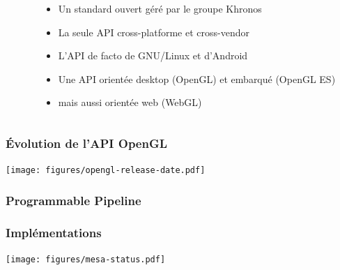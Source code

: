 \begin{frame}
\begin{columns}
\begin{column}{.2\textwidth}
\begin{center}
      \end{center}
    \end{column}
    \begin{column}{.8\textwidth}
      \begin{itemize}
        \item Un standard ouvert géré par le groupe Khronos
        \item La seule API cross-platforme et cross-vendor
        \item L'API de facto de GNU/Linux et d'Android
        \item Une API orientée desktop (OpenGL) et embarqué (OpenGL ES)
        \item mais aussi orientée web (WebGL)
      \end{itemize}
    \end{column}
  \end{columns}
\end{frame}

\begin{frame}
  \frametitle{Évolution de l'API OpenGL}
  \begin{center}
    \texttt{[image: figures/opengl-release-date.pdf]} %
  \end{center}
\end{frame}

\begin{frame}
  \frametitle{Programmable Pipeline}
\end{frame}

\begin{frame}
  \frametitle{Implémentations}
  \begin{center}
    \texttt{[image: figures/mesa-status.pdf]} %
  \end{center}
\end{frame}

